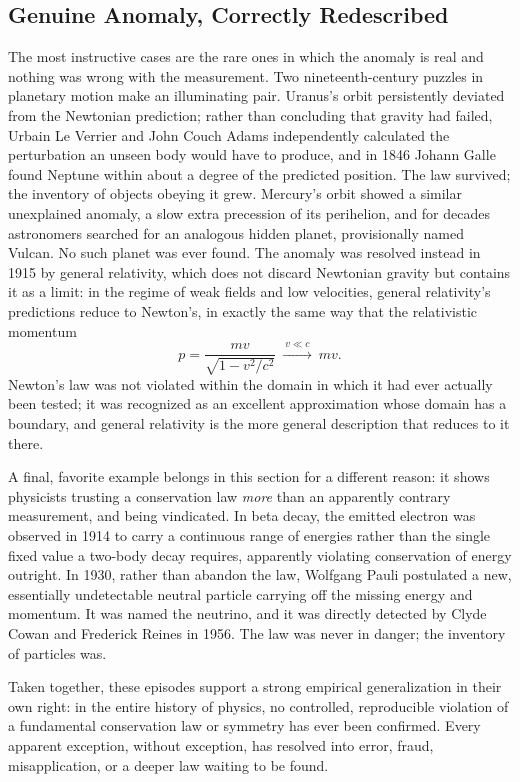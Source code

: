 \subsection{Genuine Anomaly, Correctly Redescribed}

The most instructive cases are the rare ones in which the anomaly is real
and nothing was wrong with the measurement. Two nineteenth-century puzzles
in planetary motion make an illuminating pair. Uranus's orbit persistently
deviated from the Newtonian prediction; rather than concluding that gravity
had failed, Urbain Le Verrier and John Couch Adams independently calculated
the perturbation an unseen body would have to produce, and in 1846 Johann
Galle found Neptune within about a degree of the predicted position. The
law survived; the inventory of objects obeying it grew. Mercury's orbit
showed a similar unexplained anomaly, a slow extra precession of its
perihelion, and for decades astronomers searched for an analogous hidden
planet, provisionally named Vulcan. No such planet was ever found. The
anomaly was resolved instead in 1915 by general relativity, which does not
discard Newtonian gravity but contains it as a limit: in the regime of
weak fields and low velocities, general relativity's predictions reduce to
Newton's, in exactly the same way that the relativistic momentum
\begin{equation}
  p = \frac{mv}{\sqrt{1 - v^2/c^2}}
  \ \xrightarrow{\ v \ll c\ }\
  mv .
\end{equation}
Newton's law was not violated within the domain in which it had ever
actually been tested; it was recognized as an excellent approximation
whose domain has a boundary, and general relativity is the more general
description that reduces to it there.

A final, favorite example belongs in this section for a different reason:
it shows physicists trusting a conservation law \emph{more} than an
apparently contrary measurement, and being vindicated. In beta decay, the
emitted electron was observed in 1914 to carry a continuous range of
energies rather than the single fixed value a two-body decay requires,
apparently violating conservation of energy outright. In 1930, rather than
abandon the law, Wolfgang Pauli postulated a new, essentially undetectable
neutral particle carrying off the missing energy and momentum. It was
named the neutrino, and it was directly detected by Clyde Cowan and
Frederick Reines in 1956. The law was never in danger; the inventory of
particles was.

Taken together, these episodes support a strong empirical generalization
in their own right: in the entire history of physics, no controlled,
reproducible violation of a fundamental conservation law or symmetry has
ever been confirmed. Every apparent exception, without exception, has
resolved into error, fraud, misapplication, or a deeper law waiting to be
found.

